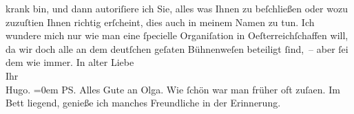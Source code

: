 \begin{ledgroupsized}[t]{13cm}
               krank bin, und dann autoriſiere ich Sie, alles was Ihnen zu {\pb}beſchließen oder wozu zuzuſti{\geminationm}en Ihnen richtig erſcheint, dies auch in meinem Namen
               zu tun.\pend
           \pstart
           Ich wundere mich nur wie man eine ſpecielle Organiſation in Oeſterreichſchaffen will, da wir doch alle an dem deutſchen
                  geſa{\geminationm}ten Bühnenweſen beteiligt ſind, – aber ſei dem
               wie immer.\pend
           \pstart
           In alter Liebe{\\[\baselineskip]}Ihr{\\[\baselineskip]}\spacefill\mbox{Hugo.}\pend
           \leftskip=0em{}\pstart
           \noindent{}\textsc{PS}. Alles Gute an Olga. Wie ſchön war man früher oft zuſa{\geminationm}en.
                  Im Bett liegend, genieße ich manches Freundliche in der Erinnerung.\pend
           
         
         \endnumbering{}\end{ledgroupsized}  \newcommand{\dateiname}{L02323}\newcommand{\titel}{Hugo Hofmannsthal an Arthur Schnitzler, 20. 4. 1919}\newcommand{\editorInnen}{Martin Anton Müller und Gerd-Hermann Susen}
      